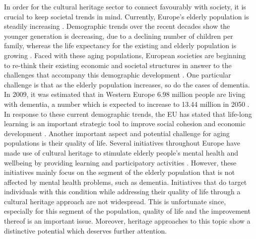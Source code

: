	In order for the cultural heritage sector to connect favourably with society, it is crucial to keep societal trends in mind. Currently, Europe’s elderly population is steadily increasing \parencite[8]{Grut_2013}. Demographic trends over the recent decades show the younger generation is decreasing, due to a declining number of children per family, whereas the life expectancy for the existing and elderly population is growing \parencite[8]{Grut_2013}. Faced with these aging populations, European societies are beginning to re-think their existing economic and societal structures in answer to the challenges that accompany this demographic development \parencite[9]{Grut_2013}. One particular challenge is that as the elderly population increases, so do the cases of dementia. In 2009, it was estimated that in Western Europe 6.98 million people are living with dementia, a number which is expected to increase to 13.44 million in 2050 \parencite[8]{International_2009}. 		
	In response to these current demographic trends, the EU has stated that life-long learning is an important strategic tool to improve social cohesion and economic development \parencite[12]{Commission_2010}. Another important aspect and potential challenge for aging populations is their quality of life. Several initiatives throughout Europe have made use of cultural heritage to stimulate elderly people’s mental health and wellbeing by providing learning and participatory activities \parencite[8]{Grut_2013}. However, these initiatives mainly focus on the segment of the elderly population that is not affected by mental health problems, such as dementia. Initiatives that do target individuals with this condition while addressing their quality of life through a cultural heritage approach are not widespread. This is unfortunate since, especially for this segment of the population, quality of life and the improvement thereof is an important issue. Moreover, heritage approaches to this topic show a distinctive potential which deserves further attention.		
		
	
